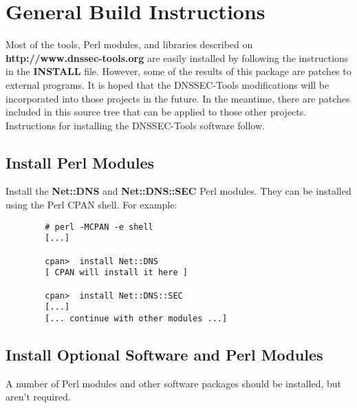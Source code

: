 \documentclass[12pt]{article}
\newcommand{\perlmod}[1]{{\bf #1}}
\newcommand{\path}[1]{{\bf #1}}
\newcommand{\url}[1]{{\bf #1}}
\begin{document}
\section{General Build Instructions}
\label{buildinstructions}

Most of the tools, Perl modules, and libraries described on
\url{http://www.dnssec-tools.org} are easily installed by following the
instructions in the \path{INSTALL} file.  However, some of the results of
this package are patches to external programs.  It is hoped that the
DNSSEC-Tools modifications will be incorporated into those projects in the
future.  In the meantime, there are patches included in this source tree that
can be applied to those other projects.  Instructions for installing the
DNSSEC-Tools software follow.


\subsection{Install Perl Modules}

Install the \perlmod{Net::DNS} and \perlmod{Net::DNS::SEC} Perl modules.
They can be installed using the Perl CPAN shell.  For example:

\begin{verbatim}
        # perl -MCPAN -e shell
        [...]

        cpan>  install Net::DNS
        [ CPAN will install it here ]

        cpan>  install Net::DNS::SEC
        [...]
        [... continue with other modules ...]
\end{verbatim}


\subsection{Install Optional Software and Perl Modules}

A number of Perl modules and other software packages should be installed, but
aren't required.
\end{document}
